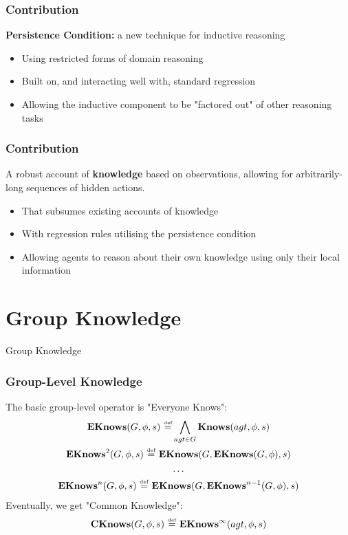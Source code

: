 \documentclass{beamer}
\newcommand{\isdef}{\hbox{$\stackrel{\mbox{\tiny def}}{=}$}}
\begin{document}
\begin{frame}
\frametitle{Contribution}
\textbf{Persistence Condition:}  a new technique for inductive reasoning
\begin{itemize}
\item Using restricted forms of domain reasoning
\item Built on, and interacting well with, standard regression
\item Allowing the inductive component to be "factored out" of other reasoning tasks
\end{itemize}
\end{frame}

\begin{frame}
\frametitle{Contribution}
A robust account of \textbf{knowledge} based on observations, allowing for
arbitrarily-long sequences of hidden actions.
\begin{itemize}
\item That subsumes existing accounts of knowledge
\item With regression rules utilising the persistence condition
\item Allowing agents to reason about their own knowledge using only their local information
\end{itemize}
\end{frame}

\section{Group Knowledge}

\begin{frame}
\centering \large Group Knowledge\\
\end{frame}


\begin{frame}
\frametitle{Group-Level Knowledge}
The basic group-level operator is "Everyone Knows":
\begin{gather*}
\mathbf{EKnows}(G,\phi,s)\ \isdef \bigwedge_{agt \in G} \mathbf{Knows}(agt,\phi,s)\\
\mathbf{EKnows}^{2}(G,\phi,s)\ \isdef\ \mathbf{EKnows}(G,\mathbf{EKnows}(G,\phi),s)\\
\dots \\
\mathbf{EKnows}^{n}(G,\phi,s)\ \isdef\ \mathbf{EKnows}(G,\mathbf{EKnows}^{n-1}(G,\phi),s)
\end{gather*}
\pause
Eventually, we get "Common Knowledge":
\begin{gather*}
\mathbf{CKnows}(G,\phi,s)\ \isdef\ \mathbf{EKnows}^{\infty}(agt,\phi,s)
\end{gather*}
\end{frame}
\end{document}
